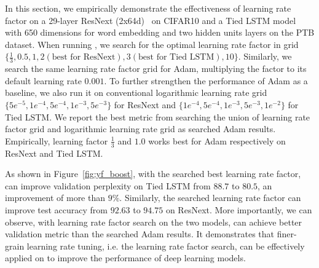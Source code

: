 In this section, we empirically demonstrate the effectiveness of learning rate factor on a 29-layer ResNext (2x64d)~\citep{xie2016aggregated} on CIFAR10 and a Tied LSTM model~\citep{press2016using} with 650 dimensions for word embedding and two hidden units layers on the PTB dataset. 
 	 When running \tuner, we search for the optimal learning rate factor in grid $\{\frac{1}{3}, 0.5, 1, 2(\text{best for ResNext} ), 3 (\text{best for Tied LSTM} ), 10\}$. 
 	 Similarly, we search the same learning rate factor grid for Adam, multiplying the factor to its default learning rate $0.001$. 
 	 To further strengthen the performance of Adam as a baseline, we also run it on conventional logarithmic learning rate grid $\{5e^{-5}, 1e^{-4}, 5e^{-4}, 1e^{-3}, 5e^{-3}\}$ for ResNext and $\{1e^{-4}, 5e^{-4}, 1e^{-3}, 5e^{-3}, 1e^{-2}\}$ for Tied LSTM. We report the best metric from searching the union of learning rate factor grid and logarithmic learning rate grid as searched Adam results.
 	 Empirically, learning factor $\frac{1}{3}$ and $1.0$ works best for Adam respectively on ResNext and Tied LSTM. 
 	 
As shown in Figure~\ref{fig:yf_boost}, with the searched best learning rate factor, \tuner can improve validation perplexity on Tied LSTM from $88.7$ to $80.5$, an improvement of more than $9\%$. Similarly, the searched learning rate factor can improve test accuracy from $92.63$ to $94.75$ on ResNext. More importantly, we can observe, with learning rate factor search on the two models, \tuner can achieve better validation metric than the searched Adam results. It demonstrates that finer-grain learning rate tuning, i.e. the learning rate factor search, can be effectively applied on \tuner to improve the performance of deep learning models.
 	
